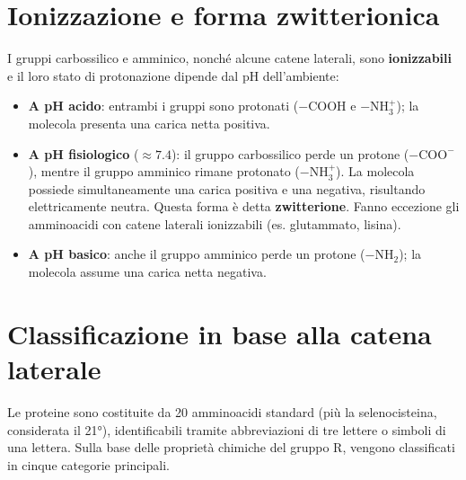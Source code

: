 \documentclass[12pt,a4paper]{report}
\begin{document}
\section{Ionizzazione e forma zwitterionica}
I gruppi carbossilico e amminico, nonché alcune catene laterali, sono \textbf{ionizzabili} e il loro stato di protonazione dipende dal pH dell'ambiente:
\begin{itemize}
\item \textbf{A pH acido}: entrambi i gruppi sono protonati (\(-\mathrm{COOH}\) e \(-\mathrm{NH_3^+}\)); la molecola presenta una carica netta positiva.
\item \textbf{A pH fisiologico} (\(\approx 7.4\)): il gruppo carbossilico perde un protone (\(-\mathrm{COO^-}\)), mentre il gruppo amminico rimane protonato (\(-\mathrm{NH_3^+}\)). La molecola possiede simultaneamente una carica positiva e una negativa, risultando elettricamente neutra. Questa forma è detta \textbf{zwitterione}. Fanno eccezione gli amminoacidi con catene laterali ionizzabili (es. glutammato, lisina).
\item \textbf{A pH basico}: anche il gruppo amminico perde un protone (\(-\mathrm{NH_2}\)); la molecola assume una carica netta negativa.
\end{itemize}

\section{Classificazione in base alla catena laterale}
Le proteine sono costituite da 20 amminoacidi standard (più la selenocisteina, considerata il 21°), identificabili tramite abbreviazioni di tre lettere o simboli di una lettera. Sulla base delle proprietà chimiche del gruppo \(\mathrm{R}\), vengono classificati in cinque categorie principali.
\end{document}
